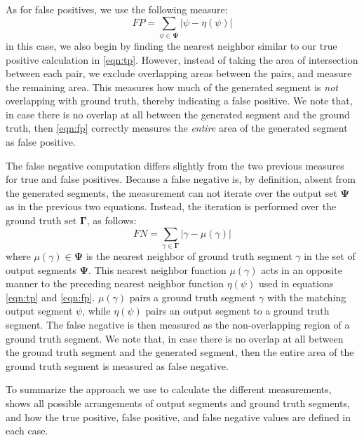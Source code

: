 As for false positives, we use the following measure:
\begin{equation}
    \label{eqn:fp}
    FP = \sum_{\psi \in \mathbf{\Psi}} \vert \psi - \eta(\psi) \vert
\end{equation}
in this case, we also begin by finding the nearest neighbor similar
to our true positive calculation in \cref{eqn:tp}.
However, instead of taking the area of intersection between each pair,
we exclude overlapping areas between the pairs, and measure the remaining area.
This measures how much of the generated segment is \emph{not} overlapping
with ground truth, thereby indicating a false positive.
We note that, in case there is no overlap at all between
the generated segment and the ground truth,
then \cref{eqn:fp} correctly measures the \emph{entire} area
of the generated segment as false positive.

The false negative computation differs slightly from the two previous measures
for true and false positives. Because a false negative is, by definition,
absent from the generated segments,
the measurement can not iterate over the output set $\mathbf{\Psi}$ as in
the previous two equations.
Instead, the iteration is performed over the ground truth set $\mathbf{\Gamma}$,
as follows: 
\begin{equation}
    \label{eqn:fn}
    FN = \sum_{\gamma \in \mathbf{\Gamma}} \vert \gamma - \mu(\gamma) \vert
\end{equation}
where $\mu(\gamma) \in \mathbf{\Psi}$ is the nearest neighbor of 
ground truth segment $\gamma$ in the set of output segments $\mathbf{\Psi}$.
This nearest neighbor function $\mu(\gamma)$ acts in an opposite manner to the
preceding nearest neighbor function $\eta(\psi)$ used in equations \ref{eqn:tp} and \ref{eqn:fp}.
$\mu(\gamma)$ pairs a ground truth segment $\gamma$ with the matching output segment $\psi$,
while $\eta(\psi)$ pairs an output segment to a ground truth segment. 
The false negative is then measured as the non-overlapping region of a ground truth segment.
We note that, in case there is no overlap at all between
the ground truth segment and the generated segment,
then the entire area of the ground truth segment is measured as false negative.

To summarize the approach we use to calculate the different measurements,
 shows all possible arrangements
of output segments and ground truth segments, and how the true positive, false positive,
and false negative values are defined in each case.

